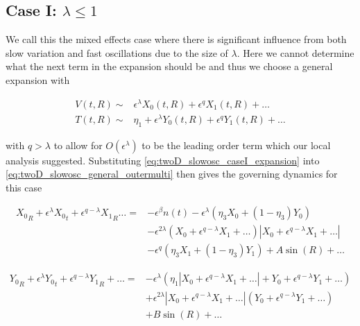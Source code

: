 \subsection{Case I: $\lambda \le 1$}

We call this the mixed effects case where there is significant influence from both slow variation and fast oscillations due to the size of $\lambda$. Here we cannot determine what the next term in the expansion should be and thus we choose a general expansion with

\begin{equation}\label{eq:twoD_slowosc_caseI_expansion}
\begin{aligned}
V(t,R)\sim& \epsilon^{\lambda} X_0(t,R)+\epsilon^q X_1(t,R)+\ldots\\
T(t,R)\sim& \eta_1+\epsilon^{\lambda} Y_0(t,R)+\epsilon^q Y_1(t,R)+\ldots
\end{aligned}
\end{equation}

with $q>\lambda$ to allow for $O(\epsilon^\lambda)$ to be the leading order term which our local analysis suggested. Substituting \eqref{eq:twoD_slowosc_caseI_expansion} into \eqref{eq:twoD_slowosc_general_outermulti} then gives the governing dynamics for this case

\begin{equation*}
\begin{aligned}
 {X_0}_R+\epsilon^{\lambda}{X_0}_t+\epsilon^{q-\lambda} {X_1}_R\ldots={} & -\epsilon^{\beta}n(t)-\epsilon^{\lambda} (\eta_3X_0+(1-\eta_3)Y_0) \\
&-\epsilon^{2\lambda}(X_0+\epsilon^{q-\lambda} X_1+\ldots)|X_0+\epsilon^{q-\lambda} X_1+\ldots|\\
& - \epsilon^{q}(\eta_3X_1+(1-\eta_3)Y_1) + A\sin(R) +\ldots
\end{aligned}
\end{equation*}

\begin{equation*}
\begin{aligned}
{Y_0}_R+\epsilon^{\lambda}{Y_0}_t+\epsilon^{q-\lambda} {Y_1}_R+\ldots= &-\epsilon^\lambda(\eta_1| X_0 +\epsilon^{q-\lambda} X_1+\ldots|+ Y_0+\epsilon^{q-\lambda} Y_1+\ldots)\\
&+\epsilon^{2\lambda}|X_0 +\epsilon^{q-\lambda} X_1+\ldots|(Y_0+\epsilon^{q-\lambda} Y_1+\ldots)\\
&+ B\sin (R)+\ldots
\end{aligned}
\end{equation*}

